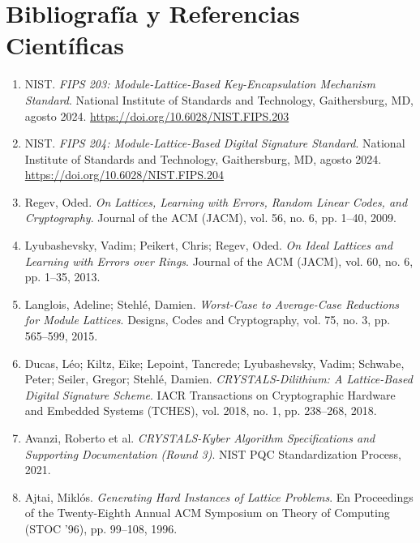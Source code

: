 \documentclass[11pt,a4paper,twoside,openright]{book}
\theoremstyle{plain}
\theoremstyle{definition}
\theoremstyle{remark}
\begin{document}
\backmatter

\chapter*{Bibliograf\'ia y Referencias Cient\'ificas}

\begin{enumerate}
  \item NIST. \textit{FIPS 203: Module-Lattice-Based Key-Encapsulation Mechanism Standard}. National Institute of Standards and Technology, Gaithersburg, MD, agosto 2024. \url{https://doi.org/10.6028/NIST.FIPS.203}
  
  \item NIST. \textit{FIPS 204: Module-Lattice-Based Digital Signature Standard}. National Institute of Standards and Technology, Gaithersburg, MD, agosto 2024. \url{https://doi.org/10.6028/NIST.FIPS.204}
  
  \item Regev, Oded. \textit{On Lattices, Learning with Errors, Random Linear Codes, and Cryptography}. Journal of the ACM (JACM), vol. 56, no. 6, pp. 1--40, 2009.
  
  \item Lyubashevsky, Vadim; Peikert, Chris; Regev, Oded. \textit{On Ideal Lattices and Learning with Errors over Rings}. Journal of the ACM (JACM), vol. 60, no. 6, pp. 1--35, 2013.
  
  \item Langlois, Adeline; Stehl\'e, Damien. \textit{Worst-Case to Average-Case Reductions for Module Lattices}. Designs, Codes and Cryptography, vol. 75, no. 3, pp. 565--599, 2015.
  
  \item Ducas, L\'eo; Kiltz, Eike; Lepoint, Tancrede; Lyubashevsky, Vadim; Schwabe, Peter; Seiler, Gregor; Stehl\'e, Damien. \textit{CRYSTALS-Dilithium: A Lattice-Based Digital Signature Scheme}. IACR Transactions on Cryptographic Hardware and Embedded Systems (TCHES), vol. 2018, no. 1, pp. 238--268, 2018.
  
  \item Avanzi, Roberto et al. \textit{CRYSTALS-Kyber Algorithm Specifications and Supporting Documentation (Round 3)}. NIST PQC Standardization Process, 2021.
  
  \item Ajtai, Mikl\'os. \textit{Generating Hard Instances of Lattice Problems}. En Proceedings of the Twenty-Eighth Annual ACM Symposium on Theory of Computing (STOC '96), pp. 99--108, 1996.
  

\end{enumerate}
\end{document}

